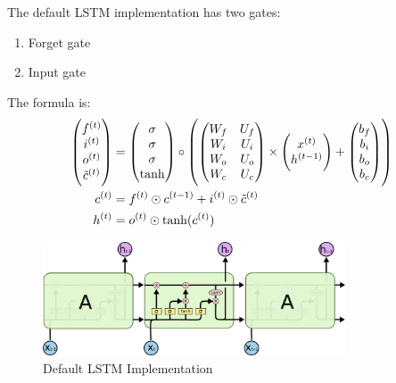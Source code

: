 \begin{definition}
The default LSTM implementation has two gates:
\begin{enumerate}
    \item Forget gate
    \item Input gate
\end{enumerate}

The formula is:
\begin{equation}
    \begin{aligned}
        \begin{pmatrix}
            {f}^{(t)} \\
            {i}^{(t)} \\
            {o}^{(t)} \\
            {\tilde{c}}^{(t)}
        \end{pmatrix} &= \begin{pmatrix}
            \sigma \\
            \sigma \\
            \sigma \\
            \tanh
        \end{pmatrix} \circ \left( \begin{pmatrix}
            W_f & U_f \\
            W_i & U_i \\
            W_o & U_o \\
            W_c & U_c
        \end{pmatrix} \times \begin{pmatrix}
            {x}^{(t)} \\
            {h}^{(t-1)}
        \end{pmatrix} + \begin{pmatrix}
            b_f \\
            b_i \\
            b_o \\
            b_c
        \end{pmatrix} \right) \\
        {c}^{(t)} &= {f}^{(t)} \odot {c}^{(t-1)} + {i}^{(t)} \odot {\tilde{c}}^{(t)} \\
        {h}^{(t)} &= {o}^{(t)} \odot \tanh({c}^{(t)})
    \end{aligned}
\end{equation}

\begin{figure}[H]
\includegraphics[width=0.8\textwidth]{pic/04/LSTM3-chain.png}
\centering
\caption{Default LSTM Implementation}
\end{figure}

\end{definition}



